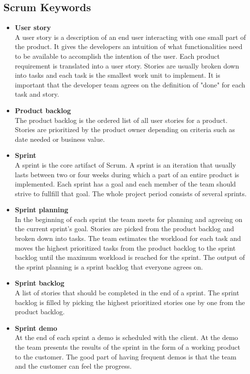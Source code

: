 \subsection{Scrum Keywords}
\begin{itemize}
\item{\textbf{User story}}\\
A user story is a description of an end user interacting with one small part
of the product. It gives the developers an intuition of what functionalities need to be available
to accomplish the intention of the user.
Each product requirement is translated into a user story. Stories are usually
broken down into tasks and each task is the smallest work unit to implement.
It is important that the developer team agrees on the definition of "done" for each task and story.

\item{\textbf{Product backlog}}\\
The product backlog is the ordered list of all user stories for a product. 
Stories are prioritized by the product owner depending on criteria such as date needed or business value.

\item{\textbf{Sprint}}\\
A sprint is the core artifact of Scrum. A sprint is an iteration that usually lasts between two or four weeks
during which a part of an entire product is implemented. Each sprint has a goal and each member of
the team should strive to fullfill that goal. The whole project period consists of several sprints.

\item{\textbf{Sprint planning}}\\
In the beginning of each sprint the team meets for planning and agreeing on the current sprint's goal.
Stories are picked from the product backlog and broken down into tasks. The team estimates the workload
for each task and moves the highest prioritized tasks from the product backlog to the
sprint backlog until the maximum workload is reached for the sprint. The output of the sprint planning
is a sprint backlog that everyone agrees on. 

\item{\textbf{Sprint backlog}}\\
A list of stories that should be completed in the end of a sprint. The sprint backlog is filled by picking the highest 
prioritized stories one by one from the product backlog. 

\item{\textbf{Sprint demo}}\\
At the end of each sprint a demo is scheduled with the client. At the demo the team presents the results of the sprint 
in the form of a working product to the customer. The good part of having frequent demos is that the team and the customer can
feel the progress. 


\end{itemize}
